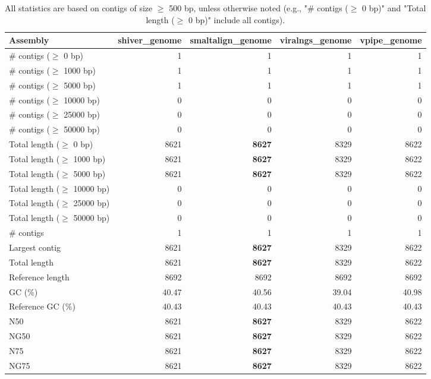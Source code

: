 \documentclass[12pt,a4paper]{article}
\begin{document}
\begin{table}[ht]
\begin{center}
\caption{All statistics are based on contigs of size $\geq$ 500 bp, unless otherwise noted (e.g., "\# contigs ($\geq$ 0 bp)" and "Total length ($\geq$ 0 bp)" include all contigs).}
\begin{tabular}{|l*{4}{|r}|}
\hline
Assembly & shiver\_genome & smaltalign\_genome & viralngs\_genome & vpipe\_genome \\ \hline
\# contigs ($\geq$ 0 bp) & 1 & 1 & 1 & 1 \\ \hline
\# contigs ($\geq$ 1000 bp) & 1 & 1 & 1 & 1 \\ \hline
\# contigs ($\geq$ 5000 bp) & 1 & 1 & 1 & 1 \\ \hline
\# contigs ($\geq$ 10000 bp) & 0 & 0 & 0 & 0 \\ \hline
\# contigs ($\geq$ 25000 bp) & 0 & 0 & 0 & 0 \\ \hline
\# contigs ($\geq$ 50000 bp) & 0 & 0 & 0 & 0 \\ \hline
Total length ($\geq$ 0 bp) & 8621 & {\bf 8627} & 8329 & 8622 \\ \hline
Total length ($\geq$ 1000 bp) & 8621 & {\bf 8627} & 8329 & 8622 \\ \hline
Total length ($\geq$ 5000 bp) & 8621 & {\bf 8627} & 8329 & 8622 \\ \hline
Total length ($\geq$ 10000 bp) & 0 & 0 & 0 & 0 \\ \hline
Total length ($\geq$ 25000 bp) & 0 & 0 & 0 & 0 \\ \hline
Total length ($\geq$ 50000 bp) & 0 & 0 & 0 & 0 \\ \hline
\# contigs & 1 & 1 & 1 & 1 \\ \hline
Largest contig & 8621 & {\bf 8627} & 8329 & 8622 \\ \hline
Total length & 8621 & {\bf 8627} & 8329 & 8622 \\ \hline
Reference length & 8692 & 8692 & 8692 & 8692 \\ \hline
GC (\%) & 40.47 & 40.56 & 39.04 & 40.98 \\ \hline
Reference GC (\%) & 40.43 & 40.43 & 40.43 & 40.43 \\ \hline
N50 & 8621 & {\bf 8627} & 8329 & 8622 \\ \hline
NG50 & 8621 & {\bf 8627} & 8329 & 8622 \\ \hline
N75 & 8621 & {\bf 8627} & 8329 & 8622 \\ \hline
NG75 & 8621 & {\bf 8627} & 8329 & 8622 \\ \hline

\end{tabular}
\end{center}
\end{table}
\end{document}
